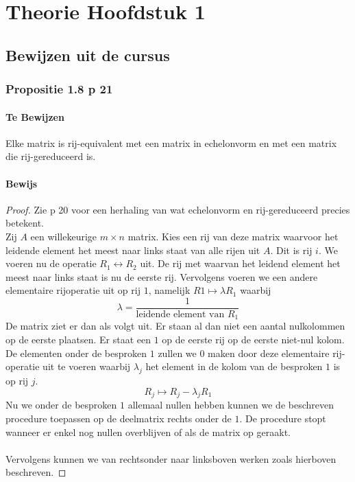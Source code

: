 \documentclass[lineaire_algebra_oplossingen.tex]{subfiles}
\begin{document}
\chapter{Theorie Hoofdstuk 1}

\section{Bewijzen uit de cursus}
\subsection{Propositie 1.8 p 21}
\subsubsection*{Te Bewijzen}
Elke matrix is rij-equivalent met een matrix in echelonvorm en met een matrix die rij-gereduceerd is.
\subsubsection*{Bewijs}
\begin{proof}
Zie p 20 voor een herhaling van wat echelonvorm en rij-gereduceerd precies betekent.\\
Zij $A$ een willekeurige $m\times n$ matrix. Kies een rij van deze matrix waarvoor het leidende element het meest naar links staat van alle rijen uit $A$. Dit is rij $i$. We voeren nu de operatie $R_1 \leftrightarrow R_2$ uit. De rij met waarvan het leidend element het meest naar links staat is nu de eerste rij. Vervolgens voeren we een andere elementaire rijoperatie uit op rij $1$, namelijk $R1\longmapsto \lambda R_1$ waarbij 
\[
\lambda = \frac{1}{\text{leidende element van } R_1}
\]
De matrix ziet er dan als volgt uit. Er staan al dan niet een aantal nulkolommen op de eerste plaatsen. Er staat een $1$ op de eerste rij op de eerste niet-nul kolom.
De elementen onder de besproken $1$ zullen we $0$ maken door deze elementaire rij-operatie uit te voeren waarbij $\lambda_j$ het element in de kolom van de besproken $1$ is op rij $j$.
\[
R_j \longmapsto R_j - \lambda_jR_1
\]
Nu we onder de besproken $1$ allemaal nullen hebben kunnen we de beschreven procedure toepassen op de deelmatrix rechts onder de $1$. De procedure stopt wanneer er enkel nog nullen overblijven of als de matrix op geraakt.\\\\
Vervolgens kunnen we van rechtsonder naar linksboven werken zoals hierboven beschreven.
\end{proof}
\end{document}
